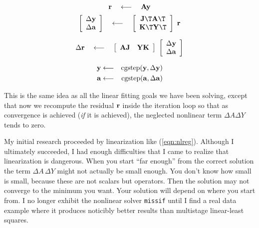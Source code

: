 \begin{equation}
 \bold r 
 \quad\longleftarrow\quad
 \bold A \bold y 
\label{eqn:progfirst}
\end{equation}
\begin{equation}
        \left[
        \begin{array}{c}
        \Delta \bold y \\
        \Delta \bold a
        \end{array}
        \right]
 \quad\longleftarrow\quad
        \left[
        \begin{array}{c}
        \bold J\T \bold A\T \\
        \bold K\T \bold Y\T
        \end{array}
        \right]
        \
        \bold r
\end{equation}

\begin{equation}
 \Delta \bold r
 \quad\longleftarrow\quad
 \left[
 \begin{array}{cc}
   \bold A \bold J   &   \bold Y \bold K 
 \end{array}
 \right]
 \
 \left[
 \begin{array}{c}
   \Delta \bold y \\
   \Delta \bold a
 \end{array}
 \right]
\end{equation}

\begin{eqnarray}
\bold y &\longleftarrow& {\rm cgstep}( \bold y, \Delta \bold y) \\ 
\bold a &\longleftarrow& {\rm cgstep}( \bold a, \Delta \bold a)
\label{eqn:proglast}
\end{eqnarray}
\par\noindent
This is the same idea as all the linear fitting goals we have been solving,
except that now we recompute
the residual $\bold r$ inside the iteration loop
so that as convergence is achieved ({\it if} it is achieved),
the neglected nonlinear term $\Delta A \Delta Y$ tends to zero.

\par
My initial research proceeded by linearization like (\ref{eqn:nlreg}).
Although I ultimately succeeded,
I had enough difficulties that
I came to realize that linearization is dangerous.
When you start ``far enough'' from the correct solution
the term $ \Delta A\, \Delta Y $
might not actually be small enough.
You don't know how small is small,
because these are not scalars but operators.
Then the solution may not converge to the minimum you want.
Your solution will depend on where you start from.
I no longer exhibit the nonlinear solver \texttt{missif}
until I find a real data example where it produces noticibly better results
than multistage linear-least squares.


